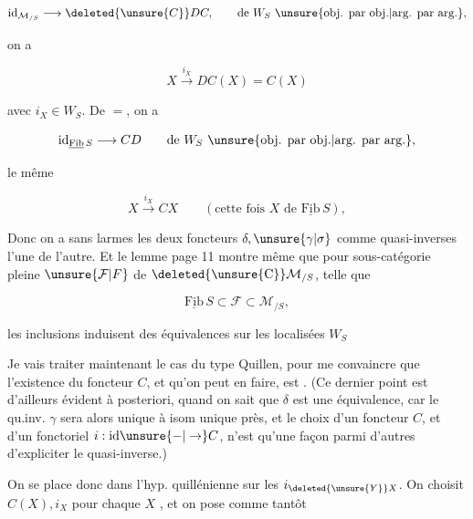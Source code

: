 \[
\mathrm{id}_{\mathcal M_{/S}}\longrightarrow\deleted{\unsure{C}}DC,\qquad\text{de }W_S\ \text{\unsure{obj. par obj.|arg. par arg.}},
\]

 on a 

\[
X\xrightarrow{i_X}DC(X)=C(X)
\]

avec $i_X\in W_S$. De $=$, on a

\[
\mathrm{id}_{\underline{\mathrm{Fib}}\,S}\longrightarrow CD\qquad\text{de }W_S\ \text{\unsure{obj. par obj.|arg. par arg.}},
\]

 le même

\[
X\xrightarrow{i_X}CX\qquad(\text{cette fois }X\text{ de }\underline{\mathrm{Fib}}\,S),
\]

Donc on a sans larmes les deux foncteurs $\delta,\unsure{\gamma|\sigma}$ comme quasi-inverses l'une de l'autre. Et le lemme page 11 montre même que pour \uline{} sous-catégorie pleine $\unsure{\mathcal F|F}$ de $\deleted{\unsure{\mathrm{C}}}\mathcal M_{/S}$, telle que

\[
\underline{\mathrm{Fib}}\,S\subset\mathcal F\subset\mathcal M_{/S},
\]

les inclusions induisent des équivalences sur les localisées $W_S$


Je vais traiter maintenant le cas du type Quillen, pour me convaincre que l'existence du foncteur $C$, et  qu'on peut en faire, est . (Ce dernier point est d'ailleurs évident à posteriori, quand on sait que $\delta$ est une équivalence, car le qu.inv. $\gamma$ sera alors unique à isom unique près, et le choix d'un foncteur $C$, et d'un  fonctoriel $i:\mathrm{id}\unsure{-|\to}C$, n'est qu'une façon parmi d'autres d'expliciter le quasi-inverse.)

 On se place donc dans l'hyp. quillénienne sur les $i_{\deleted{\unsure{Y}}X}$. On choisit $C(X),i_X$ pour chaque $X$ , et on pose comme tantôt


